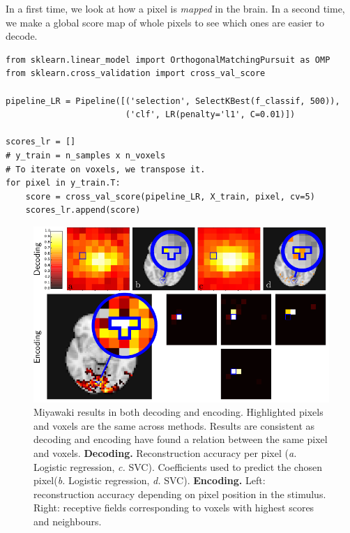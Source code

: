 \documentclass{frontiersSCNS} %
\begin{document}
In a first time, we look at how a pixel is \textit{mapped} in the brain.
In a second time, we make a global score map of whole pixels to see which ones
are easier to decode.

\begin{lstlisting}
from sklearn.linear_model import OrthogonalMatchingPursuit as OMP
from sklearn.cross_validation import cross_val_score

pipeline_LR = Pipeline([('selection', SelectKBest(f_classif, 500)),
                        ('clf', LR(penalty='l1', C=0.01)])

scores_lr = []
# y_train = n_samples x n_voxels
# To iterate on voxels, we transpose it.
for pixel in y_train.T:
    score = cross_val_score(pipeline_LR, X_train, pixel, cv=5)
    scores_lr.append(score)
\end{lstlisting}


\begin{figure}[hbtp]
  \begin{center}
    \includegraphics[width=\linewidth]{img/miyawaki/figure}
  \end{center}
  \caption{
      Miyawaki results in both decoding and encoding. Highlighted pixels and
      voxels are the same across methods. Results are consistent as decoding
      and encoding have found a relation between the same pixel and voxels.
      \textbf{Decoding.} Reconstruction accuracy per pixel (\textit{a.} Logistic
      regression, \textit{c.} SVC). Coefficients used to predict the chosen pixel(\textit{b.} Logistic
      regression, \textit{d.} SVC). 
      \textbf{Encoding.} Left: reconstruction accuracy depending on pixel
           position in the stimulus. Right: receptive fields corresponding to
       voxels with highest scores and neighbours.}
\label{fig:miyawaki}
\end{figure}
\end{document}
